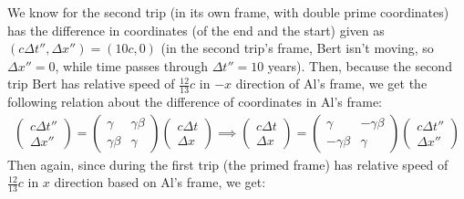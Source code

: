 \documentclass{article}
\begin{document}
We know for the second trip (in its own frame, with double prime coordinates) has the difference in coordinates (of the end and the start) given as $(c\Delta t'', \Delta x'') =   (10c, 0)$ (in the second trip's frame, Bert isn't moving, so $\Delta x'' = 0$, while time passes through $\Delta t''=10$ years). Then, because the second trip Bert has relative speed of $\frac{12}{13}c$ in $-x$ direction of Al's frame, we get the following relation about the difference of coordinates in Al's frame:
\begin{align}
    \begin{pmatrix}
        c\Delta t''\\ \Delta x''
    \end{pmatrix}=\begin{pmatrix}
        \gamma & \gamma\beta\\
        \gamma\beta & \gamma
    \end{pmatrix}\begin{pmatrix}
        c\Delta t\\ \Delta x
    \end{pmatrix}\implies 
    \begin{pmatrix}
        c\Delta t\\\Delta x
    \end{pmatrix} = \begin{pmatrix}
        \gamma & -\gamma\beta\\
        -\gamma\beta & \gamma
    \end{pmatrix}\begin{pmatrix}
        c\Delta t''\\\Delta x''
    \end{pmatrix}
\end{align}
Then again, since during the first trip (the primed frame) has relative speed of $\frac{12}{13}c$ in $x$ direction based on Al's frame, we get:
\end{document}
